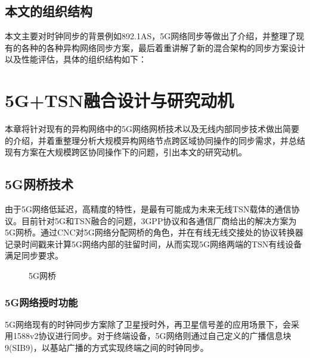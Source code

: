 \documentclass[UTF8,a4paper,12pt]{ctexart}
\numberwithin{equation}{section}
\begin{document}
\subsection{本文的组织结构}
本文主要对时钟同步的背景例如892.1AS，5G网络同步等做出了介绍，并整理了现有的各种的各种异构网络同步方案，最后着重讲解了新的混合架构的同步方案设计以及性能评估，具体的组织结构如下：

\newpage
{}
\section{5G+TSN融合设计与研究动机}
本章将针对现有的异构网络中的5G网络网桥技术以及无线内部同步技术做出简要的介绍，并着重整理分析大规模异构网络节点跨区域协同操作的同步需求，并总结现有方案在大规模跨区协同操作下的问题，引出本文的研究动机。
\subsection{5G网桥技术}
由于5G网络低延迟，高精度的特性，是最有可能成为未来无线TSN载体的通信协议。目前针对5G和TSN融合的问题，3GPP协议和各通信厂商给出的解决方案为5G网桥。通过CNC对5G网络分配网桥的角色，并在有线无线交接处的协议转换器记录时间戳来计算5G网络内部的驻留时间，从而实现5G网络两端的TSN有线设备满足同步要求。
\begin{figure}[htb] 
	\caption{5G网桥}
\end{figure}
\subsubsection{5G网络授时功能}
5G网络现有的时钟同步方案除了卫星授时外，再卫星信号差的应用场景下，会采用1588v2协议进行同步。对于终端设备，5G网络则通过自己定义的广播信息块9(SIB9)，以基站广播的方式实现终端之间的时钟同步。
\end{document}
